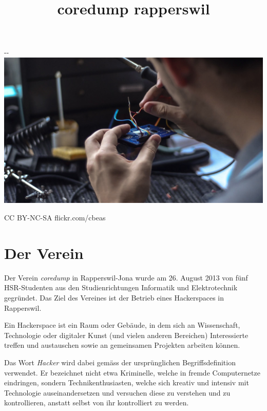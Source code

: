 \documentclass[10pt,a4paper,parskip,fleqn]{scrartcl}
\title{\Huge coredump rapperswil}
\begin{document}
\begin{titlepage}

	\maketitle

	\vspace{2cm}

	\begin{adjustwidth}{-\oddsidemargin-1in}{-\rightmargin-1in}
		\includegraphics[width=\paperwidth]{soldering.jpg}

		\vspace{-12mm}

		\hfill {\scriptsize \color{light-gray} CC BY-NC-SA flickr.com/cbeas}
	\end{adjustwidth}

	\vfill

\end{titlepage}

\section{Der Verein}

Der Verein \textit{coredump} in Rapperswil-Jona wurde am 26. August 2013 von
fünf HSR-Studenten aus den Studienrichtungen Informatik und Elektrotechnik
gegründet. Das Ziel des Vereines ist der Betrieb eines Hackerspaces in
Rapperswil.

Ein Hackerspace ist ein Raum oder Gebäude, in dem sich an Wissenschaft,
Technologie oder digitaler Kunst (und vielen anderen Bereichen) Interessierte
treffen und austauschen sowie an gemeinsamen Projekten arbeiten können.

Das Wort \textit{Hacker} wird dabei gemäss der ursprünglichen Begriffsdefinition
verwendet. Er bezeichnet nicht etwa Kriminelle, welche in fremde Computernetze
eindringen, sondern Technikenthusiasten, welche sich kreativ und intensiv mit
Technologie auseinandersetzen und versuchen diese zu verstehen und zu
kontrollieren, anstatt selbst von ihr kontrolliert zu werden.
\end{document}
